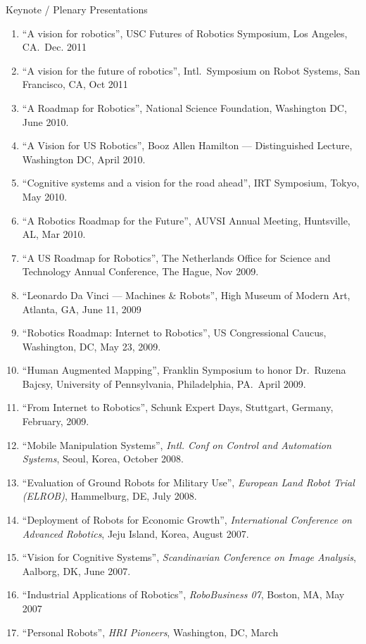 \documentclass{article}
\begin{document}
\begin{cv}
\begin{cvlist}{Keynote / Plenary Presentations}
\begin{enumerate}
			\item ``A vision for robotics'', USC Futures of Robotics Symposium, Los Angeles, CA.\  Dec. 2011
			\item ``A vision for the future of robotics'', Intl.\ Symposium on Robot Systems, San Francisco, CA, Oct 2011
			\item ``A Roadmap for Robotics'', National Science Foundation,  Washington DC, June 2010.
			\item ``A Vision for US Robotics'', Booz Allen Hamilton ---  Distinguished Lecture, Washington DC, April 2010.
			\item ``Cognitive systems and a vision for the road ahead'', IRT  Symposium, Tokyo, May 2010.
			\item ``A Robotics Roadmap for the Future'', AUVSI Annual Meeting, Huntsville, AL, Mar 2010.
			\item ``A US Roadmap for Robotics'', The Netherlands Office for Science and Technology Annual Conference, The Hague, Nov 2009.
			\item ``Leonardo Da Vinci --- Machines \& Robots'', High Museum of Modern Art, Atlanta, GA, June 11, 2009
			\item ``Robotics Roadmap: Internet to Robotics'', US Congressional Caucus, Washington, DC, May 23, 2009.
			\item ``Human Augmented Mapping'', Franklin Symposium to honor Dr.\ Ruzena Bajcsy, University of Pennsylvania, Philadelphia,
			      PA.\ April 2009.
			\item ``From Internet to Robotics'', Schunk Expert Days, Stuttgart, Germany, February, 2009.
			\item ``Mobile Manipulation Systems'', {\em Intl. Conf on Control
					      and Automation Systems}, Seoul, Korea, October 2008.
			\item ``Evaluation of Ground Robots for Military Use'', {\em
					      European Land Robot Trial (ELROB)}, Hammelburg, DE, July 2008.
			\item ``Deployment of Robots for Economic Growth'', {\em
					      International Conference on Advanced Robotics}, Jeju Island,
			      Korea, August 2007.
			\item ``Vision for Cognitive Systems'', {\em Scandinavian Conference
					      on Image Analysis}, Aalborg, DK, June 2007.
			\item ``Industrial Applications of Robotics'', {\em RoboBusiness
					      07}, Boston, MA, May 2007
			\item ``Personal Robots'', {\em HRI Pioneers}, Washington, DC, March

\end{enumerate}
\end{cvlist}
\end{cv}
\end{document}
